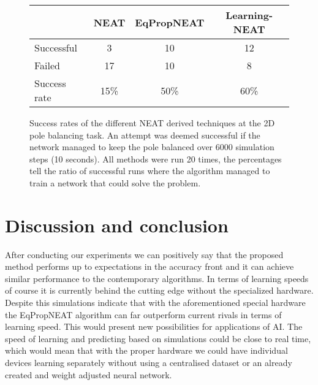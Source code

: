 \documentclass[lettersize,journal]{IEEEtran}
\begin{document}
        \begin{figure}
            \centering
            \begin{tabular}{|l||c|c|c|}
            \hline
           & NEAT & EqPropNEAT & Learning-NEAT \\
                \hline\hline
               Successful & 3& 10& 12\\\hline
               Failed & 17& 10 & 8 \\\hline
               Success rate & 15\% & 50\% & 60\%\\\hline
            \end{tabular}
            \caption{Success rates of the different NEAT derived techniques at the 2D pole balancing task. An attempt was deemed successful if the network managed to keep the pole balanced over 6000 simulation steps (10 seconds). All methods were run 20 times, the percentages tell the ratio of successful runs where the algorithm managed to train a network that could solve the problem.}
            \label{fig:rates-2dpole}
        \end{figure}

    

        \section{Discussion and conclusion}
		After conducting our experiments we can positively say that the proposed method performs up to expectations in the accuracy front and it can achieve similar performance to the contemporary algorithms. In terms of learning speeds of course it is currently behind the cutting edge without the specialized hardware. Despite this simulations indicate that with the aforementioned special hardware the EqPropNEAT algorithm can far outperform current rivals in terms of learning speed. This would present new possibilities for applications of AI. The speed of learning and predicting based on simulations could be close to real time, which would mean that with the proper hardware we could have individual devices learning separately without using a centralised dataset or an already created and weight adjusted neural network. 
		
		
		
	
\end{document}
